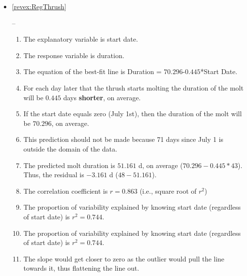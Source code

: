 \documentclass[10pt,openany]{book}\usepackage[]{graphicx}\usepackage[]{color}
\begin{document}
\begin{itemize}
  \item \hypertarget{ans:RegThrush}{\ref{revex:RegThrush}} --
    \begin{enumerate}
      \item The explanatory variable is start date.
      \item The response variable is duration.
      \item The equation of the best-fit line is Duration = $70.296$-$0.445$*Start Date.
      \item For each day later that the thrush starts molting the duration of the molt will be $0.445$ days \textbf{shorter}, on average.
      \item If the start date equals zero (July 1st), then the duration of the molt will be $70.296$, on average.
      \item This prediction should not be made because 71 days since July 1 is outside the domain of the data.
      \item The predicted molt duration is $51.161$ d, on average ($70.296-0.445*43$).  Thus, the residual is $-3.161$ d ($48-51.161$).
      \item The correlation coefficient is $r=0.863$ (i.e., square root of $r^{2}$)
      \item The proportion of variability explained by knowing start date (regardless of start date) is $r^{2}=0.744$.
      \item The proportion of variability explained by knowing start date (regardless of start date) is $r^{2}=0.744$.
      \item The slope would get closer to zero as the outlier would pull the line towards it, thus flattening the line out.
    \end{enumerate}


\end{itemize}
\end{document}
